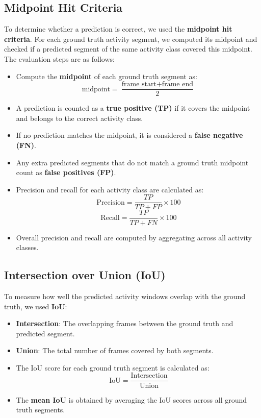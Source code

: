 \documentclass{article}
\begin{document}
\subsection{Midpoint Hit Criteria}

To determine whether a prediction is correct, we used the \textbf{midpoint hit criteria}. For each ground truth activity segment, we computed its midpoint and checked if a predicted segment of the same activity class covered this midpoint. The evaluation steps are as follows:

\begin{itemize}
    \item Compute the \textbf{midpoint} of each ground truth segment as:
    \begin{equation}
        \text{midpoint} = \frac{\text{frame\_start} + \text{frame\_end}}{2}
    \end{equation}
    \item A prediction is counted as a \textbf{true positive (TP)} if it covers the midpoint and belongs to the correct activity class.
    \item If no prediction matches the midpoint, it is considered a \textbf{false negative (FN)}.
    \item Any extra predicted segments that do not match a ground truth midpoint count as \textbf{false positives (FP)}.
    \item Precision and recall for each activity class are calculated as:
    \begin{equation}
        \text{Precision} = \frac{TP}{TP + FP} \times 100
    \end{equation}
    \begin{equation}
        \text{Recall} = \frac{TP}{TP + FN} \times 100
    \end{equation}
    \item Overall precision and recall are computed by aggregating across all activity classes.
\end{itemize}

\subsection{Intersection over Union (IoU)}

To measure how well the predicted activity windows overlap with the ground truth, we used \textbf{IoU}:

\begin{itemize}
    \item \textbf{Intersection}: The overlapping frames between the ground truth and predicted segment.
    \item \textbf{Union}: The total number of frames covered by both segments.
    \item The IoU score for each ground truth segment is calculated as:
    \begin{equation}
        \text{IoU} = \frac{\text{Intersection}}{\text{Union}}
    \end{equation}
    \item The \textbf{mean IoU} is obtained by averaging the IoU scores across all ground truth segments.
\end{itemize}
\end{document}
